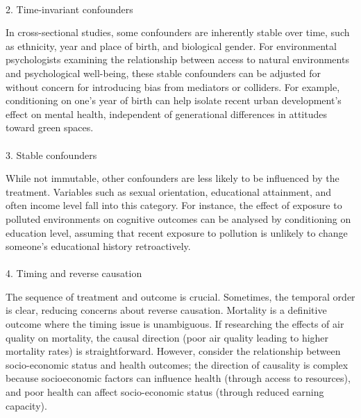\documentclass[
  single column]{article}
\makeatletter
\let\oldparagraph\paragraph
\renewcommand{\paragraph}{
    \@ifstar
      \xxxParagraphStar
      \xxxParagraphNoStar
  }
\newcommand{\xxxParagraphStar}[1]{\oldparagraph*{#1}\mbox{}}
\newcommand{\xxxParagraphNoStar}[1]{\oldparagraph{#1}\mbox{}}
\makeatother
\begin{document}
\paragraph{2. Time-invariant
confounders}\label{time-invariant-confounders}

In cross-sectional studies, some confounders are inherently stable over
time, such as ethnicity, year and place of birth, and biological gender.
For environmental psychologists examining the relationship between
access to natural environments and psychological well-being, these
stable confounders can be adjusted for without concern for introducing
bias from mediators or colliders. For example, conditioning on one's
year of birth can help isolate recent urban development's effect on
mental health, independent of generational differences in attitudes
toward green spaces.

\paragraph{3. Stable confounders}\label{stable-confounders}

While not immutable, other confounders are less likely to be influenced
by the treatment. Variables such as sexual orientation, educational
attainment, and often income level fall into this category. For
instance, the effect of exposure to polluted environments on cognitive
outcomes can be analysed by conditioning on education level, assuming
that recent exposure to pollution is unlikely to change someone's
educational history retroactively.

\paragraph{4. Timing and reverse
causation}\label{timing-and-reverse-causation}

The sequence of treatment and outcome is crucial. Sometimes, the
temporal order is clear, reducing concerns about reverse causation.
Mortality is a definitive outcome where the timing issue is unambiguous.
If researching the effects of air quality on mortality, the causal
direction (poor air quality leading to higher mortality rates) is
straightforward. However, consider the relationship between
socio-economic status and health outcomes; the direction of causality is
complex because socioeconomic factors can influence health (through
access to resources), and poor health can affect socio-economic status
(through reduced earning capacity).
\end{document}
